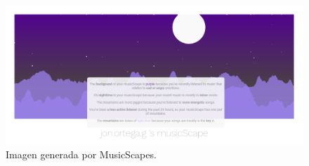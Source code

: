 \begin{figure}[htbp]
    \centering
    \includegraphics[width=\textwidth]{figures/music_scapes_ejemplo.png}
    \caption{Imagen generada por MusicScapes.}
    \label{fig:musicscapes_ejemplo}
\end{figure}
